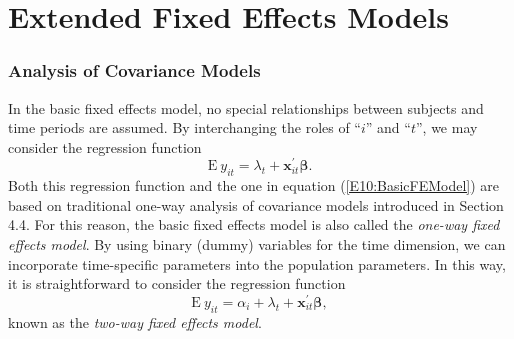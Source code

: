 \linejed

\section{Extended Fixed Effects Models}\label{S10:FEModels2}

\subsubsection*{Analysis of Covariance Models}

In the basic fixed effects model, no special relationships between
subjects and time periods are assumed. By interchanging the roles of
``$i$'' and ``$t$'', we may consider the regression function
\begin{equation*}
\mathrm{E}~y_{it} = \lambda_t + \mathbf{x}_{it}^{\prime} \boldsymbol
\beta.
\end{equation*} Both this regression
function and the one in equation (\ref{E10:BasicFEModel}) are based
on traditional one-way analysis of covariance models introduced in
Section 4.4. For this reason, the basic fixed effects model is also
called the \emph{one-way fixed effects model}. By using binary
(dummy) variables for the time dimension, we can incorporate
time-specific parameters into the population parameters. In this
way, it is straightforward to consider the regression function
\begin{equation*}
\mathrm{E}~y_{it} = \alpha_i + \lambda_t + \mathbf{x}_{it}^{\prime}
\boldsymbol \beta ,
\end{equation*}
known as the \emph{two-way fixed effects model}.

\bigskip
\linejed

